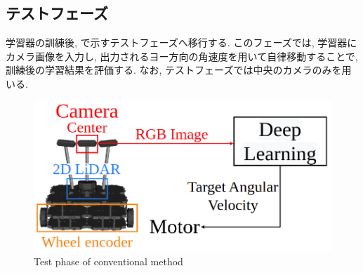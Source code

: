 \subsection{テストフェーズ}
学習器の訓練後, で示すテストフェーズへ移行する. このフェーズでは, 学習器にカメラ画像を入力し, 出力されるヨー方向の角速度を用いて自律移動することで, 訓練後の学習結果を評価する. なお, テストフェーズでは中央のカメラのみを用いる.

\vspace{3cm}


\begin{figure}[hbtp]
  \centering
 \includegraphics[keepaspectratio, scale=0.4]
      {images/test_phase2.png}
 \caption{Test phase of conventional method}
 \label{Fig:test_phase}
\end{figure}


\newpage